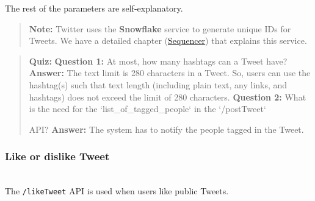 \begin{table}[htbp]
\centering
\small
{}
\end{table}

The rest of the parameters are self-explanatory.
\begin{quote}
\textbf{Note:} Twitter uses the \textbf{Snowflake} service to generate unique IDs for Tweets. We have a detailed chapter (\href{https://www.educative.io/courses/grokking-the-system-design-interview/system-design-sequencer}{Sequencer}) that explains this service.
\end{quote}

\begin{quote}
\textbf{Quiz:}
\textbf{Question 1:} At most, how many hashtags can a Tweet have?
\textbf{Answer:} The text limit is 280 characters in a Tweet. So, users can use the hashtag(s) such that text length (including plain text, any links, and hashtags) does not exceed the limit of 280 characters.
\textbf{Question 2:} What is the need for the `list\_of\_tagged\_people` in the `/postTweet`

API?
\textbf{Answer:} The system has to notify the people tagged in the Tweet.
\end{quote}

\subsubsection{Like or dislike Tweet}\label{F4S1nMvfqbU3d2uWR0_JA}
\\
The \texttt{/likeTweet} API is used when users like public Tweets.

